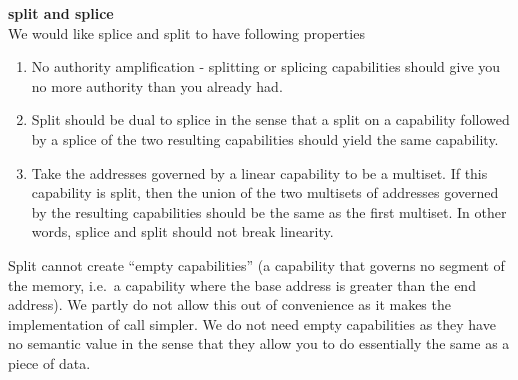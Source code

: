 \documentclass[a4paper]{article}
\begin{document}
\noindent\textbf{split and splice}\\
We would like splice and split to have following properties
\begin{enumerate}
\item No authority amplification - splitting or splicing capabilities should give you no more authority than you already had.
\item Split should be dual to splice in the sense that a split on a capability followed by a splice of the two resulting capabilities should yield the same capability.
\item Take the addresses governed by a linear capability to be a multiset. If this capability is split, then the union of the two multisets of addresses governed by the resulting capabilities should be the same as the first multiset. In other words, splice and split should not break linearity.
\end{enumerate}
Split cannot create ``empty capabilities'' (a capability that governs no segment of the memory, i.e.\ a capability where the base address is greater than the end address). We partly do not allow this out of convenience as it makes the implementation of call simpler. We do not need empty capabilities as they have no semantic value in the sense that they allow you to do essentially the same as a piece of data.
\end{document}
